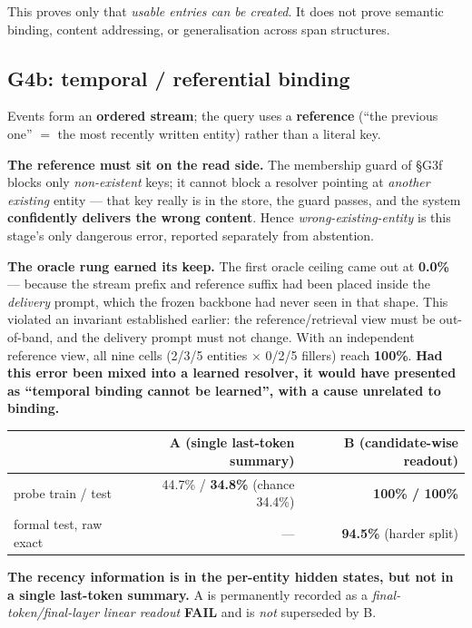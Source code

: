 \documentclass[11pt, a4paper]{article}
\newcommand{\FAIL}{\textcolor{red!70!black}{\textbf{FAIL}}}
\begin{document}
This proves only that \emph{usable entries can be created}. It does not prove semantic
binding, content addressing, or generalisation across span structures.

\subsection{G4b: temporal / referential binding}

Events form an \textbf{ordered stream}; the query uses a \textbf{reference} (``the
previous one'' $=$ the most recently written entity) rather than a literal key.

\textbf{The reference must sit on the read side.} The membership guard of \S G3f blocks
only \emph{non-existent} keys; it cannot block a resolver pointing at \emph{another
existing} entity --- that key really is in the store, the guard passes, and the system
\textbf{confidently delivers the wrong content}. Hence \emph{wrong-existing-entity} is
this stage's only dangerous error, reported separately from abstention.

\textbf{The oracle rung earned its keep.} The first oracle ceiling came out at
\textbf{0.0\%} --- because the stream prefix and reference suffix had been placed inside
the \emph{delivery} prompt, which the frozen backbone had never seen in that shape. This
violated an invariant established earlier: the reference/retrieval view must be
out-of-band, and the delivery prompt must not change. With an independent reference view,
all nine cells (2/3/5 entities $\times$ 0/2/5 fillers) reach \textbf{100\%}. \textbf{Had
this error been mixed into a learned resolver, it would have presented as ``temporal
binding cannot be learned'', with a cause unrelated to binding.}

\begin{table}[h]
\centering\small
\begin{tabular}{lrr}
\toprule
& A (single last-token summary) & \textbf{B (candidate-wise readout)} \\
\midrule
probe train / test & 44.7\% / \textbf{34.8\%} (chance 34.4\%) & \textbf{100\% / 100\%} \\
formal test, raw exact & --- & \textbf{94.5\%} (harder split) \\
\bottomrule
\end{tabular}
\end{table}

\textbf{The recency information is in the per-entity hidden states, but not in a single
last-token summary.} A is permanently recorded as a \emph{final-token/final-layer linear
readout} \FAIL{} and is \emph{not} superseded by B.
\end{document}
